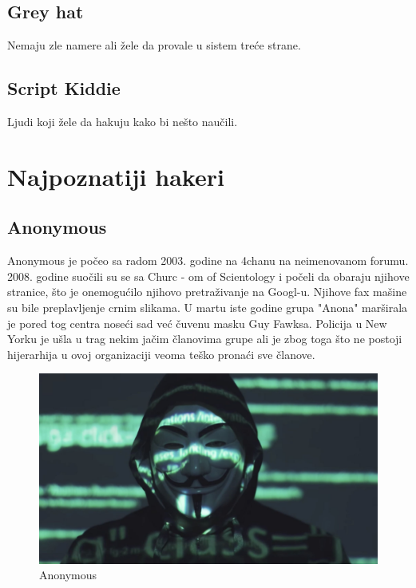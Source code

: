 \documentclass[a4paper]{article}
\begin{document}
\subsection{Grey hat}
Nemaju zle namere ali žele da provale u sistem treće strane.
\subsection{Script Kiddie}
Ljudi koji žele da hakuju kako bi nešto naučili.
\newpage



\section{Najpoznatiji hakeri}
\label{hakeri}

\subsection{Anonymous}
Anonymous je počeo sa radom 2003. godine na 4chanu na neimenovanom forumu. 2008. godine suočili su se sa Churc - om of Scientology i počeli da obaraju njihove stranice, što je onemogućilo njihovo pretraživanje na Googl-u. Njihove fax mašine su bile preplavljenje crnim slikama. U martu iste godine grupa "Anona" marširala je pored tog centra noseći sad već čuvenu masku  Guy Fawksa. Policija u New Yorku je ušla u trag nekim jačim članovima grupe ali je zbog toga što ne postoji hijerarhija u ovoj organizaciji veoma teško pronaći sve članove.





\begin{figure}[h!]
\begin{center}
\includegraphics[scale=0.10]{anonymous.jpg}
\end{center}
\caption{Anonymous}
\label{fig:anonymous}
\end{figure}
\end{document}
